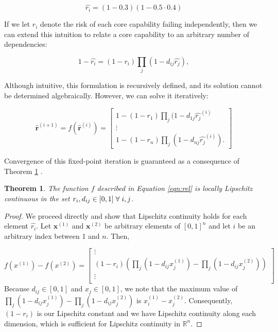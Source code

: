 \documentclass{article}
\newtheorem{thm}{Theorem}
\begin{document}
\begin{equation}
\label{prob-example}
\hat{r_i} = (1-0.3)(1-0.5\cdot 0.4)
\end{equation}

If we let $r_i$ denote the risk of each core capability failing independently, then we can extend this intuition to relate a core capability to an arbitrary number of dependencies:

\begin{equation}
\label{eqn:rel}
1-\hat{r_i} = (1-r_i)\prod_j  \left(1-d_{ij}\hat{r_j}\right),
\end{equation}

Although intuitive, this formulation is recursively defined, and its solution cannot be determined algebraically. However, we can solve it iteratively:

\begin{equation}
\mathbf{\hat{r}}^{(i+1)} = f\left(\mathbf{\hat{r}}^{(i)}\right) = \begin{bmatrix} 
1-(1-r_1)\prod_j  (1-d_{1j}\hat{r_j}^{(i)}\\
\vdots\\
1-(1-r_n)\prod_j  (1-d_{nj}\hat{r_j}^{(i)}).
\end{bmatrix}
\end{equation}

Convergence of this fixed-point iteration is guaranteed as a consequence of Theorem \ref{thm:lipschitz} \citep{linear-algebra}. 

\begin{thm}
\label{thm:lipschitz}
The function $f$ described in Equation \ref{eqn:rel} is locally Lipschitz continuous in the set $r_i, d_{ij} \in [0,1] \hspace{1mm} \forall \hspace{1mm} i,j$.
\end{thm}
\begin{proof}
We proceed directly and show that Lipschitz continuity holds for each element $\hat{r_i}$. Let $\mathbf{x}^{(1)}$ and $\mathbf{x}^{(2)}$ be arbitrary elements of $[0,1]^n$ and let $i$ be an arbitrary index between 1 and $n$. Then, 

\begin{equation}
f\left(x^{(1)}\right) - f\left(x^{(2)}\right) = 
\begin{bmatrix}
\vdots \\
(1-r_i)\left( \prod_j \left(1-d_{ij} x_j^{(1)} \right) -  \prod_j \left(1-d_{ij} x_j^{(2)} \right) \right)\\
\vdots\\
\end{bmatrix}
\end{equation}
Because $d_{ij}\in [0,1]$ and $x_{j}\in [0,1]$, we note that the maximum value of $\prod_j \left(1-d_{ij} x_j^{(1)} \right) -  \prod_j \left(1-d_{ij} x_j^{(2)} \right)$ is $x_i^{(1)} - x_j^{(2)}$. Consequently, $(1-r_i)$ is our Lipschitz constant and we have Lipschitz continuity along each dimension, which is sufficient for Lipschitz continuity in $\mathbb{R}^n$.
\end{proof}
\end{document}
